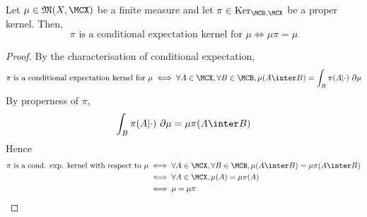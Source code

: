 \begin{lemma}
    \label{lem:cond-exp-proper-ker-bind}
    \leanok

    Let $\mu\in\mathfrak{M}(X,\MCX)$ be a finite measure and let $\pi\in\text{Ker}_{\MCB,\MCX}$ be a proper kernel. Then,
    $$\pi \text{ is a conditional expectation kernel for }\mu \iff \mu\pi = \mu$$
\end{lemma}
\begin{proof}
    \leanok

    By the characterisation of conditional expectation,
    $$\pi \text{ is a conditional expectation kernel for }\mu \iff \forall A \in \MCX, \forall B \in \MCB, \mu(A \inter B) = \int_B \pi(A|\cdot)\ \partial\mu$$
    By properness of $\pi$,
    $$\int_B \pi(A|\cdot)\ \partial\mu = \mu\pi(A \inter B)$$
    Hence
    \begin{align}
        \pi \text{ is a cond. exp. kernel with respect to }\mu
        & \iff \forall A \in \MCX, \forall B \in \MCB, \mu(A \inter B) = \mu\pi(A \inter B) \\
        & \iff \forall A \in \MCX, \mu(A) = \mu\pi(A) \\
        & \iff \mu = \mu\pi
    \end{align}
\end{proof}
